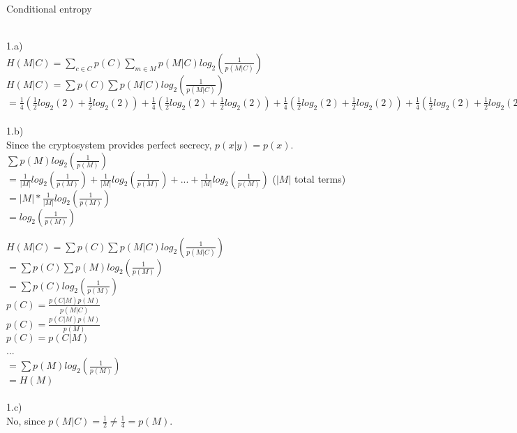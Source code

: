 \documentclass{assignment}
\begin{document}
\begin{problemlist}
\pbitem Conditional entropy
\begin{problem}
\begin{answer}
\\
1.a)\\

$H(M|C)=\sum_{c\in C}p(C)\sum_{m\in M}p(M|C)log_2(\frac{1}{p(M|C)})$\\

$H(M|C)=\sum p(C)\sum p(M|C)log_2(\frac{1}{p(M|C)})$\\
$=\frac{1}{4}(\frac{1}{2}log_2(2) + \frac{1}{2}log_2(2)) + \frac{1}{4}(\frac{1}{2}log_2(2) + \frac{1}{2}log_2(2)) + \frac{1}{4}(\frac{1}{2}log_2(2) + \frac{1}{2}log_2(2)) + \frac{1}{4}(\frac{1}{2}log_2(2) + \frac{1}{2}log_2(2))$\\
\\
1.b)\\
Since the cryptosystem provides perfect secrecy, $p(x|y)=p(x)$.\\
$\sum p(M)log_2(\frac{1}{p(M)})$\\
$=\frac{1}{|M|}log_2(\frac{1}{p(M)})+\frac{1}{|M|}log_2(\frac{1}{p(M)})+...+\frac{1}{|M|}log_2(\frac{1}{p(M)})$  ($|M|$ total terms)\\
$=|M|*\frac{1}{|M|}log_2(\frac{1}{p(M)})$ \\
$=log_2(\frac{1}{p(M)})$ 

$H(M|C)=\sum p(C)\sum p(M|C)log_2(\frac{1}{p(M|C)})$\\
$=\sum p(C)\sum p(M)log_2(\frac{1}{p(M)})$\\
$=\sum p(C)log_2(\frac{1}{p(M)})$\\

$p(C)=\frac{p(C|M)p(M)}{p(M|C)}$\\
$p(C)=\frac{p(C|M)p(M)}{p(M)}$\\
$p(C)=p(C|M)$\\
...\\
$=\sum p(M)log_2(\frac{1}{p(M)})$\\
$=H(M)$\\
\\
1.c)\\
No, since $p(M|C)=\frac{1}{2}\neq\frac{1}{4}=p(M)$.\\
\\
\end{answer}
\end{problem}


\end{problemlist}
\end{document}
